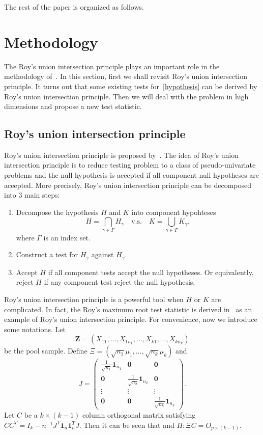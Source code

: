 \documentclass[review]{elsarticle}
\newcommand{\bZ}{\mathbf{Z}}
\theoremstyle{plain}
\theoremstyle{definition}
\theoremstyle{remark}
\begin{document}
    The rest of the paper is organized  as follows.

    
\section{Methodology}
The Roy's union intersection principle plays an important role in the methodology of~\cite{Zhao2016A}.
In this section, first we shall revisit Roy's union intersection principle.
 It turns out that some existing tests for~\eqref{hypothesis} can be derived by Roy's union intersection principle.
 Then we will deal with the problem in high dimensions and propose a new test statistic.
\subsection{Roy's union intersection principle}
Roy's union intersection principle is proposed by~\cite{Roy1953}.
The idea of Roy's union intersection principle is to reduce testing problem to a class of pseudo-univariate problems and the null hypothesis is accepted if all component null hypotheses are aceepted.
More precisely, Roy's union intersection principle can be decomposed into $3$ main steps:
\begin{enumerate}
    \item
        Decompose the hypothesis $H$ and $K$ into component hypohteses
        $$
        H=\bigcap_{\gamma\in\Gamma} H_\gamma \quad \text{v.s.} \quad 
        K=\bigcup_{\gamma\in \Gamma} K_{\gamma},
        $$
        where $\Gamma$ is an index set.
    \item
        Construct a test for $H_{\gamma}$ against $H_{\gamma}$.
    \item
        Accept $H$ if all component tests accept the null hypotheses. Or equivalently, reject $H$ if any component test reject the null hypothesis.
\end{enumerate}

 Roy's union intersection principle is a powerful tool when $H$ or $K$ are complicated.
 In fact, the Roy's maximum root test statistic is derived in~\cite{Roy1953} as an example of Roy's union intersection principle.
 For convenience, now we introduce some notations.
 Let
 $$\bZ=(X_{11},\ldots,X_{1n_1},\ldots,X_{k1},\ldots,X_{kn_k})$$
 be the pool sample.
 Define $\Xi=(\sqrt{n_1}\mu_1,\ldots,\sqrt{n_k}\mu_k)$ and
 $$
 J=\begin{pmatrix}
     \frac{1}{\sqrt{n_1}}\mathbf{1}_{n_1}&\mathbf{0} & \mathbf{0}\\
     \mathbf{0}&\frac{1}{\sqrt{n_2}} \mathbf{1}_{n_2}& \mathbf{0}\\
     \vdots &\vdots &\vdots \\
     \mathbf{0}&\mathbf{0}&\frac{1}{\sqrt{n_k}}\mathbf{1}_{n_k}
 \end{pmatrix}.
 $$
 Let $C$ be a $k\times (k-1)$ column orthogonal matrix satisfying $CC^T=I_{k}-n^{-1} J^T \mathbf{1}_n \mathbf{1}_n^T J$.
 Then it can be seen that and $
 H:\Xi C=O_{p\times (k-1)}
 $.
\end{document}

